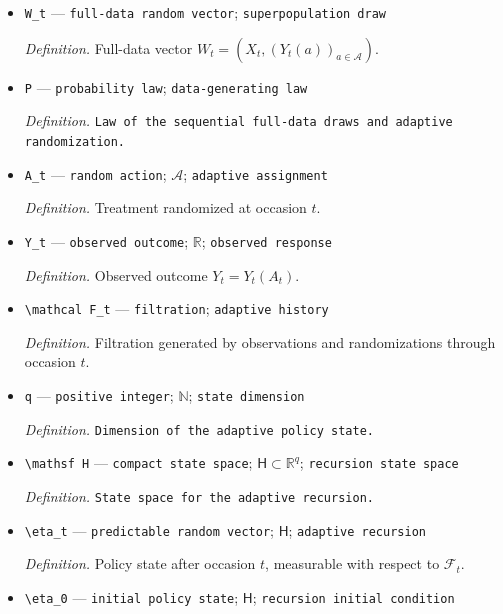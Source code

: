 \documentclass{article}
\begin{document}
\begin{itemize}
  \item \texttt{W\_\allowbreak{}t} --- \texttt{full-\allowbreak{}data random vector}; \texttt{superpopulation draw}
  \par\smallskip\noindent\emph{Definition.} Full-data vector \(W_t=(X_t,(Y_t(a))_{a\in\mathcal A})\).
  \item \texttt{P} --- \texttt{probability law}; \texttt{data-\allowbreak{}generating law}
  \par\smallskip\noindent\emph{Definition.} \texttt{Law of the sequential full-\allowbreak{}data draws and adaptive randomization.}
  \item \texttt{A\_\allowbreak{}t} --- \texttt{random action}; \(\mathcal A\); \texttt{adaptive assignment}
  \par\smallskip\noindent\emph{Definition.} Treatment randomized at occasion \(t\).
  \item \texttt{Y\_\allowbreak{}t} --- \texttt{observed outcome}; \(\mathbb R\); \texttt{observed response}
  \par\smallskip\noindent\emph{Definition.} Observed outcome \(Y_t=Y_t(A_t)\).
  \item \texttt{\textbackslash{}\allowbreak{}mathcal F\_\allowbreak{}t} --- \texttt{filtration}; \texttt{adaptive history}
  \par\smallskip\noindent\emph{Definition.} Filtration generated by observations and randomizations through occasion \(t\).
  \item \texttt{q} --- \texttt{positive integer}; \(\mathbb N\); \texttt{state dimension}
  \par\smallskip\noindent\emph{Definition.} \texttt{Dimension of the adaptive policy state.}
  \item \texttt{\textbackslash{}\allowbreak{}mathsf H} --- \texttt{compact state space}; \(\mathsf H\subset\mathbb R^q\); \texttt{recursion state space}
  \par\smallskip\noindent\emph{Definition.} \texttt{State space for the adaptive recursion.}
  \item \texttt{\textbackslash{}\allowbreak{}eta\_\allowbreak{}t} --- \texttt{predictable random vector}; \(\mathsf H\); \texttt{adaptive recursion}
  \par\smallskip\noindent\emph{Definition.} Policy state after occasion \(t\), measurable with respect to \(\mathcal F_t\).
  \item \texttt{\textbackslash{}\allowbreak{}eta\_\allowbreak{}0} --- \texttt{initial policy state}; \(\mathsf H\); \texttt{recursion initial condition}

\end{itemize}
\end{document}
